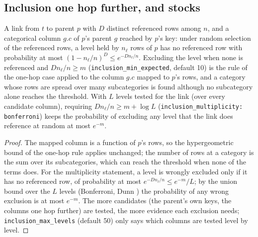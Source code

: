 \subsection*{Inclusion one hop further, and stocks}
\setcounter{proposition}{1785}
\begin{proposition}\label{prop:twohop}
A link from $t$ to parent $p$ with $D$ distinct referenced rows among $n$, and a categorical column $g.c$ of $p$'s parent $g$ reached by $p$'s key: under random selection of the referenced rows, a level held by $n_\ell$ rows of $p$ has no referenced row with probability at most $(1-n_\ell/n)^D\le e^{-Dn_\ell/n}$. Excluding the level when none is referenced and $Dn_\ell/n\ge m$ (\texttt{inclusion\_min\_expected}, default 10) is the rule of the one-hop case applied to the column $g.c$ mapped to $p$'s rows, and a category whose rows are spread over many subcategories is found although no subcategory alone reaches the threshold. With $L$ levels tested for the link (over every candidate column), requiring $Dn_\ell/n\ge m+\log L$ (\texttt{inclusion\_multiplicity: bonferroni}) keeps the probability of excluding any level that the link does reference at random at most $e^{-m}$.
\end{proposition}
\begin{proof}
The mapped column is a function of $p$'s rows, so the hypergeometric bound of the one-hop rule applies unchanged; the number of rows at a category is the sum over its subcategories, which can reach the threshold when none of the terms does. For the multiplicity statement, a level is wrongly excluded only if it has no referenced row, of probability at most $e^{-Dn_\ell/n}\le e^{-m}/L$; by the union bound over the $L$ levels (Bonferroni, Dunn \cite{dunn1961}) the probability of any wrong exclusion is at most $e^{-m}$. The more candidates (the parent's own keys, the columns one hop further) are tested, the more evidence each exclusion needs; \texttt{inclusion\_max\_levels} (default 50) only says which columns are tested level by level.
\end{proof}


